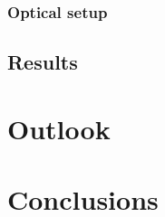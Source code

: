 \documentclass[pdflatex, sectionletters, 12pt]{pittetd}    %
\begin{document}
\subsection{Optical setup}

\section{Results}

\chapter{Outlook}

\chapter{Conclusions}

%
\appendix                          %
%

% 

\end{document}
